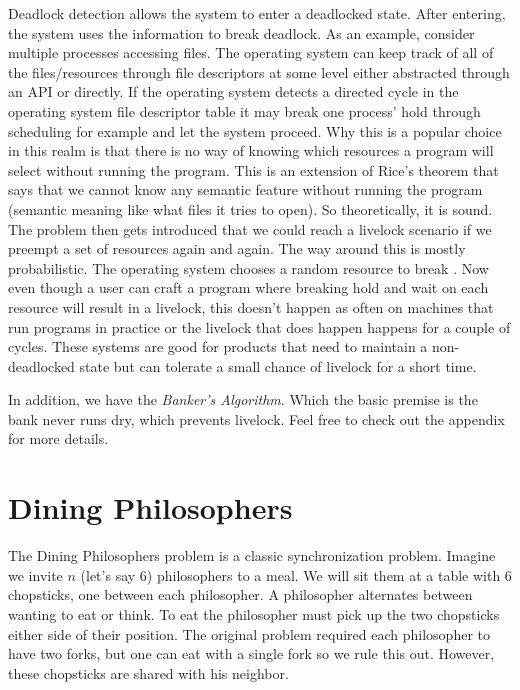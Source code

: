 Deadlock detection allows the system to enter a deadlocked state.
After entering, the system uses the information to break deadlock.
As an example, consider multiple processes accessing files.
The operating system can keep track of all of the files/resources through file descriptors at some level either abstracted through an API or directly.
If the operating system detects a directed cycle in the operating system file descriptor table it may break one process' hold through scheduling for example and let the system proceed.
Why this is a popular choice in this realm is that there is no way of knowing which resources a program will select without running the program.
This is an extension of Rice's theorem \cite{rice} that says that we cannot know any semantic feature without running the program (semantic meaning like what files it tries to open).
So theoretically, it is sound.
The problem then gets introduced that we could reach a livelock scenario if we preempt a set of resources again and again.
The way around this is mostly probabilistic.
The operating system chooses a random resource to break .
Now even though a user can craft a program where breaking hold and wait on each resource will result in a livelock, this doesn't happen as often on machines that run programs in practice or the livelock that does happen happens for a couple of cycles.
These systems are good for products that need to maintain a non-deadlocked state but can tolerate a small chance of livelock for a short time.

In addition, we have the \textit{Banker's Algorithm}. Which the basic premise is the bank never runs dry, which prevents livelock. Feel free to check out the appendix for more details.

\section{Dining Philosophers}

The Dining Philosophers problem is a classic synchronization problem.
Imagine we invite $n$ (let's say 6) philosophers to a meal.
We will sit them at a table with 6 chopsticks, one between each philosopher.
A philosopher alternates between wanting to eat or think.
To eat the philosopher must pick up the two chopsticks either side of their position.
The original problem required each philosopher to have two forks, but one can eat with a single fork so we rule this out.
However, these chopsticks are shared with his neighbor.

